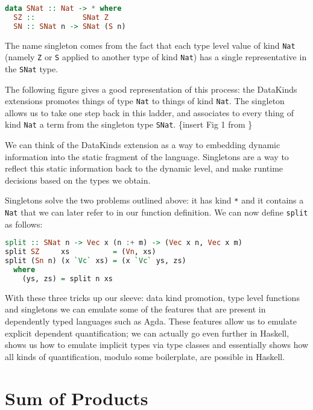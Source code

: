 \documentclass[11pt]{article}
\begin{document}
\begin{lstlisting}[language=haskell]
data SNat :: Nat -> * where
  SZ ::           SNat Z
  SN :: SNat n -> SNat (S n)
\end{lstlisting}

The name singleton comes from the fact that each type level value of
kind \texttt{Nat} (namely \texttt{Z} or \texttt{S} applied to another
type of kind \texttt{Nat}) has a single representative in the
\texttt{SNat} type.

The following figure gives a good representation of this process: the
DataKinds extensions promotes things of type \texttt{Nat} to things of
kind \texttt{Nat}. The singleton allows us to take one step back in this
ladder, and associates to every thing of kind \texttt{Nat} a term from
the singleton type \texttt{SNat}. \{insert Fig 1 from
\cite{singletons1}\}


We can think of the DataKinds extension as a way to embedding dynamic information into the static fragment of 
the language. Singletons are a way to reflect this static information back to 
the dynamic level, and make runtime decisions based on the types we obtain.


Singletons solve the two problems outlined above: it has kind \texttt{*}
and it contains a \texttt{Nat} that we can later refer to in our
function definition. We can now define \texttt{split} as follows:

\begin{lstlisting}[language=haskell]
split :: SNat n -> Vec x (n :+ m) -> (Vec x n, Vec x m)
split SZ     xs          = (Vn, xs)
split (Sn n) (x `Vc` xs) = (x `Vc` ys, zs)
  where
    (ys, zs) = split n xs
\end{lstlisting}

With these three tricks up our sleeve: data kind promotion, type level
functions and singletons we can emulate some of the features that are
present in dependently typed languages such as Agda. These features allow us to 
emulate explicit dependent quantification; we can actually go even further in 
Haskell, \cite{hasochism} shows us how to emulate implicit types via type 
classes and essentially shows how all kinds of quantification, modulo some boilerplate, are possible in 
Haskell.

\section{Sum of Products}
\end{document}
